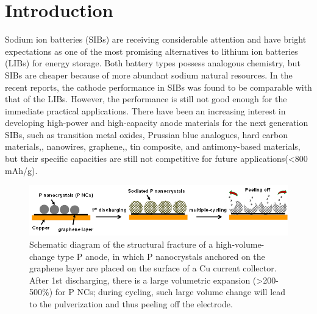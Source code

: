 \section{Introduction}
Sodium ion batteries (SIBs) are receiving considerable attention and have bright expectations as one of the most promising alternatives to lithium ion batteries (LIBs) for energy storage.\cite{Ren2014c,Yang2011c,Liu2014a,Wen2014b,Shen2015b,wang2014e,Wu2014b,Yao2015b,Ni2014b} Both battery types possess analogous chemistry, but SIBs are cheaper because of more abundant sodium natural resources. In the recent reports, the cathode performance in SIBs was found to be comparable with that of the LIBs.\cite{Sun2014b,Barpanda2014b} However, the performance is still not good enough for the immediate practical applications. There have been an increasing interest in developing high-power and high-capacity anode materials for the next generation SIBs,\cite{Ong2011b,Palomares2012b,Zhu2014b,Yu2014b,Berthelot2011b,Qian2012d,Wang2013g,Komaba2011b,Cao2012b,Wang2013h,Xu2013b,Qian2012e} such as transition metal oxides,\cite{Zhu2014b,Yu2014b,Berthelot2011b} Prussian blue analogues,\cite{Qian2012d,Wang2013g} hard carbon materials,\cite{Komaba2011b}, nanowires,\cite{Cao2012b} graphene,\cite{Wen2014b,Wang2013h}, tin composite, \cite{Xu2013b} and antimony-based materials\cite{Qian2012e}, but their specific capacities are still not competitive for future applications(<800 mAh/g). \\

\begin{figure}  
\includegraphics[width=\textwidth]{figures/figure4_s1}
\caption[Peeling off after cycling]
{Schematic diagram of the structural fracture of a high-volume-change type P anode, in which P nanocrystals anchored on the graphene layer are placed on the surface of a Cu current collector. After 1st discharging, there is a large volumetric expansion (>200-500\%) for P NCs; during cycling, such large volume change will lead to the pulverization and thus peeling off the electrode.
\label{fig:4_s1}}
\end{figure}

